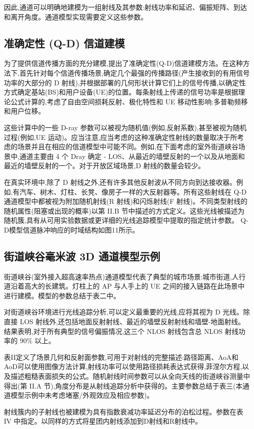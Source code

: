 因此,通道可以明确地建模为一组射线及其参数:射线功率和延迟、偏振矩阵、到达和离开角度。通道模型实现需要定义这些参数。
\subsection[]{准确定性 (Q-D) 信道建模}
为了提供信道传播方面的充分建模,提出了准确定性(Q-D)信道建模方法。在这种方法下,首先针对每个信道传播场景,确定几个最强的传播路径(产生接收到的有用信号功率的大部分的 D 射线),并根据部署的几何形状计算它们上的信号传播,以确定性方式确定基站(BS)和用户设备(UE)的位置。每条射线上传递的信号功率是根据理论公式计算的,考虑了自由空间损耗反射、极化特性和 UE 移动性影响:多普勒频移和用户位移。

这些计算中的一些 D-ray 参数可以被视为随机值(例如,反射系数),甚至被视为随机过程(例如,UE 运动)。应当注意,应当考虑的这种准确定性射线的数量取决于所考虑的场景并且在相应的信道模型中可能不同。例如,在下面考虑的室外街道峡谷场景中,通道主要由 4 个 Dray 确定 - LOS、从最近的墙壁反射的一个以及从地面和最近的墙壁反射的一个。对于开放区域场景,D 射线的数量会较少。

在真实环境中,除了 D 射线之外,还有许多其他反射波从不同方向到达接收器。例如,有汽车、树木、灯柱、长凳、像房子一样的大反射器等。所有这些射线在 Q-D 通道模型中都被视为附加随机射线(R 射线)和闪烁射线(F 射线)。不同类型射线的随机属性(阻塞或出现的概率)以第 II.B 节中描述的方式定义。这些光线被描述为随机簇,具有从可用实验数据或更详细的光线追踪模型中提取的指定统计参数。 Q-D模型信道脉冲响应的时域结构如图11所示。
\subsection{街道峡谷毫米波 3D 通道模型示例}
街道峡谷(室外接入超高速率热点)通道模型代表了典型的城市场景:城市街道,人行道沿着高大的长建筑。灯柱上的 AP 与人手上的 UE 之间的接入链路在此场景中进行建模。模型的参数总结于表二中。

对街道峡谷环境进行光线追踪分析,可以定义最重要的光线,应将其视为 D 光线。除直接 LOS 射线外,还包括地面反射射线、最近的墙壁反射射线和墙壁-地面射线。结果表明,对于所有典型的信号偏振情况,这三个 NLOS 射线包含总 NLOS 射线功率的 90\% 以上。

表II定义了场景几何和反射面参数,可用于对射线的完整描述:路径距离、AoA和AoD可以使用图像方法计算,射线功率可以使用路径损耗表达式获得,菲涅尔方程,以及描述粗糙表面损失的公式。随机射线时间参数可以从全向天线的街道峡谷测量中得出(第 II.A 节),角度分布是从射线追踪分析中获得的。主要参数总结于表三(本通道模型示例中未考虑堵塞/外观效应及相应参数)。

射线簇内的子射线也被建模为具有指数衰减功率延迟分布的泊松过程。参数在表 IV 中指定。以同样的方式将星团内射线添加到D射线和R射线中。

